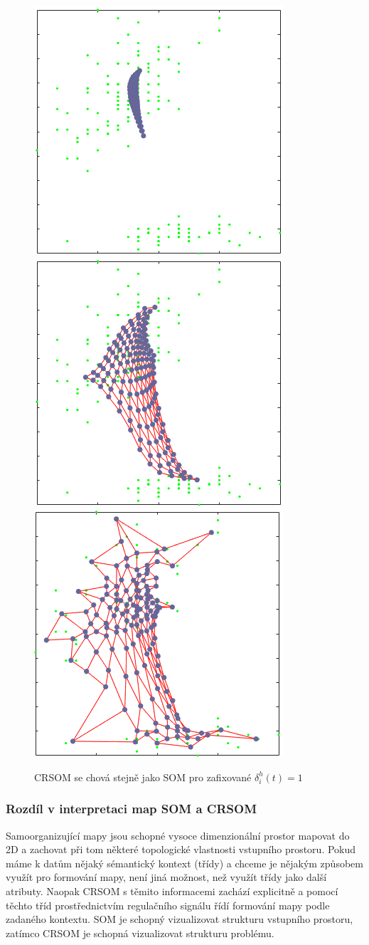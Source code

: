 \documentclass[thesis=M,czech]{FITthesis}[2012/06/26]
\begin{document}
\begin{figure}[htp]
    \centering
    
    \includegraphics[width=.32\textwidth]{s1.png}
    \includegraphics[width=.32\textwidth]{s2.png}
    \includegraphics[width=.32\textwidth]{s3.png}
    \caption{CRSOM se chová stejně jako SOM pro zafixované $ \delta_i^h(t) = 1 $ }
    \label{fig:delta_1}
\end{figure}


\subsubsection*{Rozdíl v interpretaci map SOM a CRSOM}
Samoorganizující mapy jsou schopné vysoce dimenzionální prostor mapovat do 2D a zachovat při tom některé topologické vlastnosti vstupního prostoru. Pokud máme k datům nějaký sémantický kontext (třídy) a chceme je nějakým způsobem využít pro formování mapy, není jiná možnost, než využít třídy jako další atributy. Naopak CRSOM s těmito informacemi zachází explicitně a pomocí těchto tříd prostřednictvím regulačního signálu řídí formování mapy podle zadaného kontextu. SOM je schopný vizualizovat strukturu vstupního prostoru, zatímco CRSOM je schopná vizualizovat strukturu problému\cite{hartono14}.
\end{document}
